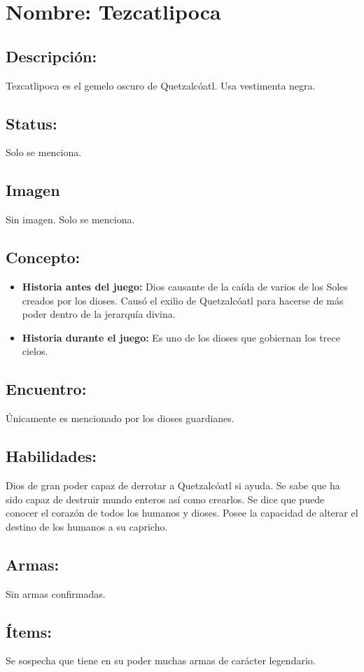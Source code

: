 \section{Nombre: Tezcatlipoca}  \label{per:tezcatlipoca}
\subsection{Descripción:}
Tezcatlipoca es el gemelo oscuro de Quetzalcóatl. Usa vestimenta negra. 
\subsection{Status:}
Solo se menciona.
\subsection{Imagen}
Sin imagen. Solo se menciona.
\subsection{Concepto:}
\begin{itemize}
	\item \textbf{Historia antes del juego:}
	Dios causante de la caída de varios de los Soles creados por los dioses. Causó el exilio de Quetzalcóatl para hacerse de más poder dentro de la jerarquía divina. 
	\item \textbf{Historia durante el juego:}
	Es uno de los dioses que gobiernan los trece cielos.
\end{itemize} 
\subsection{Encuentro:}
Únicamente es mencionado por los dioses guardianes.
\subsection{Habilidades:}
Dios de gran poder capaz de derrotar a Quetzalcóatl si ayuda. Se sabe que ha sido capaz de destruir mundo enteros así como crearlos. Se dice que puede conocer el corazón de todos los humanos y dioses. Posee la capacidad de alterar el destino de los humanos a su capricho.
\subsection{Armas:}
Sin armas confirmadas.
\subsection{Ítems:}
Se sospecha que tiene en su poder muchas armas de carácter legendario.
